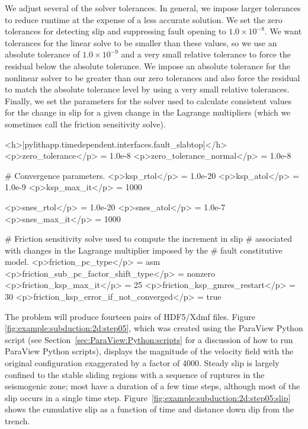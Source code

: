 We adjust several of the solver tolerances. In general, we impose
larger tolerances to reduce runtime at the expense of a less accurate
solution. We set the zero tolerances for detecting slip and
suppressing fault opening to $1.0 \times 10^{-8}$. We want tolerances
for the linear solve to be smaller than these values, so we use an
absolute tolerance of $1.0 \times 10^{-9}$ and a very small relative
tolerance to force the residual below the absolute tolerance. We
impose an absolute tolerance for the nonlinear solver to be greater
than our zero tolerances and also force the residual to match the
absolute tolerance level by using a very small relative
tolerances. Finally, we set the parameters for the solver used to
calculate consistent values for the change in slip for a given change
in the Lagrange multipliers (which we sometimes call the friction
sensitivity solve).
\begin{cfg}
<h>[pylithapp.timedependent.interfaces.fault_slabtop]</h>
<p>zero_tolerance</p> = 1.0e-8
<p>zero_tolerance_normal</p> = 1.0e-8

# Convergence parameters.
<p>ksp_rtol</p> = 1.0e-20
<p>ksp_atol</p> = 1.0e-9
<p>ksp_max_it</p> = 1000

<p>snes_rtol</p> = 1.0e-20
<p>snes_atol</p> = 1.0e-7
<p>snes_max_it</p> = 1000

# Friction sensitivity solve used to compute the increment in slip
# associated with changes in the Lagrange multiplier imposed by the
# fault constitutive model.
<p>friction_pc_type</p> = asm
<p>friction_sub_pc_factor_shift_type</p> = nonzero
<p>friction_ksp_max_it</p> = 25
<p>friction_ksp_gmres_restart</p> = 30
<p>friction_ksp_error_if_not_converged</p> = true
\end{cfg}

The problem will produce fourteen pairs of HDF5/Xdmf files. Figure
\vref{fig:example:subduction:2d:step05}, which was created using the
ParaView Python script  (see
Section~\vref{sec:ParaView:Python:scripts} for a discussion of how to
run ParaView Python scripts), displays the magnitude of the velocity
field with the original configuration exaggerated by a factor of
4000. Steady slip is largely confined to the stable sliding regions
with a sequence of ruptures in the seismogenic zone; most have a
duration of a few time steps, although most of the slip occurs in a
single time step. Figure~\ref{fig:example:subduction:2d:step05:slip}
shows the cumulative slip as a function of time and distance down dip
from the trench.

